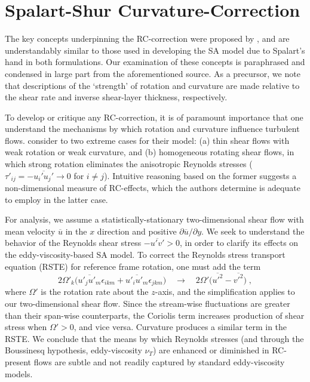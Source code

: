 \documentclass[11pt]{article}
\begin{document}
\section{Spalart-Shur Curvature-Correction} %

The key concepts underpinning the RC-correction were proposed by \citet{spalart1997}, and are understandably similar to those used in developing the SA model due to Spalart's hand in both formulations. Our examination of these concepts is paraphrased and condensed in large part from the aforementioned source. As a precursor, we note that descriptions of the `strength' of rotation and curvature are made relative to the shear rate and inverse shear-layer thickness, respectively.

To develop or critique any RC-correction, it is of paramount importance that one understand the mechanisms by which rotation and curvature influence turbulent flows. \citet{spalart1997} consider to two extreme cases for their model: (a) thin shear flows with weak rotation or weak curvature, and (b) homogeneous rotating shear flows, in which strong rotation eliminates the anisotropic Reynolds stresses ($\tau'_{ij} = -\overline{u_i' u_j'} \rightarrow 0$ for $i \ne j$). Intuitive reasoning based on the former suggests a non-dimensional measure of RC-effects, which the authors determine is adequate to employ in the latter case.

For analysis, we assume a statistically-stationary two-dimensional shear flow with mean velocity $\overline{u}$ in the $x$ direction and positive $\partial \overline{u} / \partial y$. We seek to understand the behavior of the Reynolds shear stress $-\overline{u'v'} > 0$, in order to clarify its effects on the eddy-viscosity-based SA model. To correct the Reynolds stress transport equation (RSTE) for reference frame rotation, one must add the term
\begin{equation}
2 \Omega'_k \big( \overline{u'_j u'_m} \epsilon_{ikm} + \overline{u'_i u'_m} \epsilon_{jkm} \big)
\quad \rightarrow \quad
2 \Omega' \big( \overline{u'^2} - \overline{v'^2} \big)
\;,
\end{equation}
where $\Omega'$ is the rotation rate about the $z$-axis, and the simplification applies to our two-dimensional shear flow. Since the stream-wise fluctuations are greater than their span-wise counterparts, the Coriolis term increases production of shear stress when $\Omega' > 0$, and vice versa. Curvature produces a similar term in the RSTE. We conclude that the means by which Reynolds stresses (and through the Boussinesq hypothesis, eddy-viscosity $\nu_T$) are enhanced or diminished in RC-present flows are subtle and not readily captured by standard eddy-viscosity models.
\end{document}
